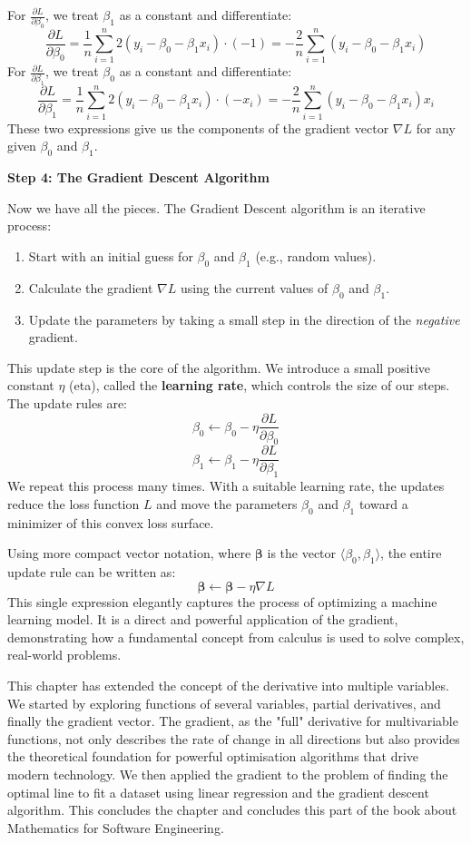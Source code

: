 \begin{solution}
For \(\frac{\partial L}{\partial \beta_0}\), we treat \(\beta_1\) as a constant and differentiate:
\[
\frac{\partial L}{\partial \beta_0} = \frac{1}{n} \sum_{i=1}^{n} 2(y_i - \beta_0 - \beta_1 x_i) \cdot (-1) = -\frac{2}{n} \sum_{i=1}^{n} (y_i - \beta_0 - \beta_1 x_i)
\]
For \(\frac{\partial L}{\partial \beta_1}\), we treat \(\beta_0\) as a constant and differentiate:
\[
\frac{\partial L}{\partial \beta_1} = \frac{1}{n} \sum_{i=1}^{n} 2(y_i - \beta_0 - \beta_1 x_i) \cdot (-x_i) = -\frac{2}{n} \sum_{i=1}^{n} (y_i - \beta_0 - \beta_1 x_i) x_i
\]
These two expressions give us the components of the gradient vector \(\nabla L\) for any given \(\beta_0\) and \(\beta_1\).

\vspace{1em}
\textbf{Step 4: The Gradient Descent Algorithm}

Now we have all the pieces. The Gradient Descent algorithm is an iterative process:
\begin{enumerate}
    \item Start with an initial guess for \(\beta_0\) and \(\beta_1\) (e.g., random values).
    \item Calculate the gradient \(\nabla L\) using the current values of \(\beta_0\) and \(\beta_1\).
    \item Update the parameters by taking a small step in the direction of the \emph{negative} gradient.
\end{enumerate}
This update step is the core of the algorithm. We introduce a small positive constant \(\eta\) (eta), called the \textbf{learning rate}, which controls the size of our steps. The update rules are:
\[
\beta_0 \leftarrow \beta_0 - \eta \frac{\partial L}{\partial \beta_0}
\]
\[
\beta_1 \leftarrow \beta_1 - \eta \frac{\partial L}{\partial \beta_1}
\]
We repeat this process many times. With a suitable learning rate, the updates reduce the loss function \(L\) and move the parameters \(\beta_0\) and \(\beta_1\) toward a minimizer of this convex loss surface.

Using more compact vector notation, where \(\boldsymbol{\beta}\) is the vector \(\langle \beta_0, \beta_1 \rangle\), the entire update rule can be written as:
\[
\boldsymbol{\beta} \leftarrow \boldsymbol{\beta} - \eta \nabla L
\]
This single expression elegantly captures the process of optimizing a machine learning model. It is a direct and powerful application of the gradient, demonstrating how a fundamental concept from calculus is used to solve complex, real-world problems. \end{solution}

This chapter has extended the concept of the derivative into multiple variables. We started by exploring functions of several variables, partial derivatives, and finally the gradient vector. The gradient, as the "full" derivative for multivariable functions, not only describes the rate of change in all directions but also provides the theoretical foundation for powerful optimisation algorithms that drive modern technology. We then applied the gradient to the problem of finding the optimal line to fit a dataset using linear regression and the gradient descent algorithm. This concludes the chapter and concludes this part of the book about Mathematics for Software Engineering.
